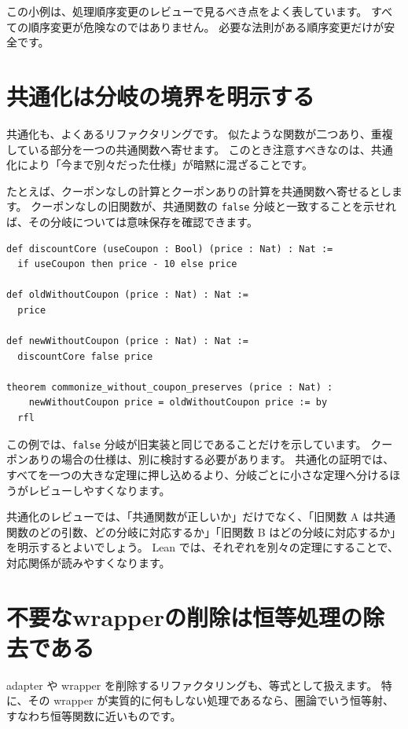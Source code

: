 この小例は、処理順序変更のレビューで見るべき点をよく表しています。
すべての順序変更が危険なのではありません。
必要な法則がある順序変更だけが安全です。

\section{共通化は分岐の境界を明示する}

共通化も、よくあるリファクタリングです。
似たような関数が二つあり、重複している部分を一つの共通関数へ寄せます。
このとき注意すべきなのは、共通化により「今まで別々だった仕様」が暗黙に混ざることです。

たとえば、クーポンなしの計算とクーポンありの計算を共通関数へ寄せるとします。
クーポンなしの旧関数が、共通関数の \texttt{false} 分岐と一致することを示せれば、その分岐については意味保存を確認できます。

\begin{listing}[htbp]
\begin{verbatim}
def discountCore (useCoupon : Bool) (price : Nat) : Nat :=
  if useCoupon then price - 10 else price

def oldWithoutCoupon (price : Nat) : Nat :=
  price

def newWithoutCoupon (price : Nat) : Nat :=
  discountCore false price

theorem commonize_without_coupon_preserves (price : Nat) :
    newWithoutCoupon price = oldWithoutCoupon price := by
  rfl
\end{verbatim}
\caption{\texttt{commonize\_without\_coupon\_preserves}}
\label{lst:ch34-commonize-preserves}
\end{listing}

この例では、\texttt{false} 分岐が旧実装と同じであることだけを示しています。
クーポンありの場合の仕様は、別に検討する必要があります。
共通化の証明では、すべてを一つの大きな定理に押し込めるより、分岐ごとに小さな定理へ分けるほうがレビューしやすくなります。

共通化のレビューでは、「共通関数が正しいか」だけでなく、「旧関数 A は共通関数のどの引数、どの分岐に対応するか」「旧関数 B はどの分岐に対応するか」を明示するとよいでしょう。
Lean では、それぞれを別々の定理にすることで、対応関係が読みやすくなります。

\section{不要なwrapperの削除は恒等処理の除去である}

adapter や wrapper を削除するリファクタリングも、等式として扱えます。
特に、その wrapper が実質的に何もしない処理であるなら、圏論でいう恒等射、すなわち恒等関数に近いものです。

